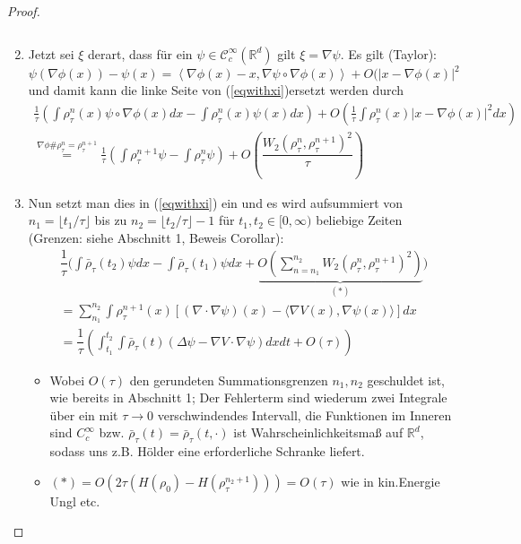 \documentclass[11pt,a4paper,notitlepage]{scrreprt}
\newcommand{\RR}{\mathbb{R}}
\begin{document}
\begin{proof}
\begin{enumerate}
\begin{equation}
\end{equation}
\item Jetzt sei $\xi$ derart, dass für ein $\psi\in \mathcal{C}^\infty_c(\RR^d)$ gilt $\xi=\nabla\psi$. Es gilt (Taylor):
\begin{equation}
\psi(\nabla\phi(x))-\psi(x)=\left\langle\nabla\phi(x)-x,\nabla\psi\circ\nabla\phi(x)\right\rangle+O(\vert x-\nabla\phi(x)\vert^2
\end{equation}
und damit kann die linke Seite von (\ref{eqwithxi})ersetzt werden durch
\begin{align*}
\frac{1}{\tau}\left(\int \rho_\tau^n(x)\psi\circ\nabla\phi(x)dx-\int\rho_\tau^n(x)\psi(x)dx\right)+O\left(\frac{1}{\tau}\int\rho_\tau^n(x)\vert x-\nabla\phi(x)\vert^2dx\right)\\
\overset{\nabla\phi\#\rho_\tau^n=\rho_\tau^{n+1}}=\frac{1}{\tau}\left(\int\rho_\tau^{n+1}\psi-\int\rho_\tau^n\psi\right)+O\left(\dfrac{W_2(\rho_\tau^n,\rho_\tau^{n+1})^2}{\tau}\right)
\end{align*}
\item Nun setzt man dies in (\ref{eqwithxi}) ein und es wird aufsummiert von $n_1=\lfloor t_1/\tau\rfloor$ bis zu $n_2=\lfloor t_2/\tau\rfloor-1$ für $t_1,t_2\in[0,\infty)$ beliebige Zeiten (Grenzen: siehe Abschnitt 1, Beweis Corollar):
\begin{eqnarray}
\dfrac{1}{\tau}\Bigg(\int\bar{\rho}_\tau(t_2)\psi dx-\int\bar{\rho}_\tau(t_1)\psi dx+\underset{(*)}{\underbrace{O\left(\sum_{n=n_1}^{n_2}W_2(\rho_\tau^n,\rho_\tau^{n+1})^2\right)}}\Bigg)\\
=\sum_{n_1}^{n_2}\int\rho_\tau^{n+1}(x)\left[(\nabla\cdot \nabla\psi)(x)-\langle\nabla V(x),\nabla\psi(x)\rangle \right]dx \\=\dfrac{1}{\tau}\left(\int_{t_1}^{t_2}\int\bar{\rho}_\tau(t)(\Delta\psi-\nabla V\cdot\nabla\psi)dx dt+O(\tau)\right)
\end{eqnarray}
\begin{itemize}
\item Wobei $O(\tau)$ den gerundeten Summationsgrenzen $n_1,n_2$ geschuldet ist, wie bereits in Abschnitt 1; Der Fehlerterm sind wiederum zwei Integrale über ein mit $\tau\to0$ verschwindendes Intervall, die Funktionen im Inneren sind $C_c^\infty$ bzw. $\bar{\rho}_\tau(t)=\bar{\rho}_\tau(t,\cdot)$ ist Wahrscheinlichkeitsmaß auf $\RR^d$, sodass uns z.B. Hölder eine erforderliche Schranke liefert.
\item  
$(*)=O(2\tau(H(\rho_0)-H(\rho_\tau^{n_2+1})))=O(\tau)$ wie in kin.Energie Ungl etc.
\end{itemize}

\end{enumerate}
\end{proof}
\end{document}
